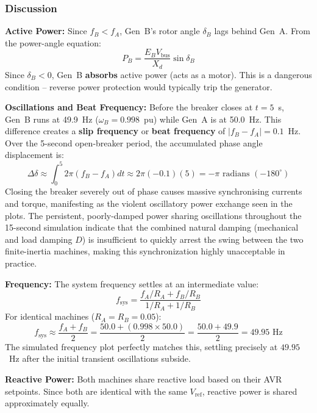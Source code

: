 \documentclass[12pt, a4paper]{article}
\begin{document}
\subsubsection{Discussion}

\textbf{Active Power:}
Since $f_B < f_A$, Gen~B's rotor angle $\delta_B$ lags behind Gen~A. From the power-angle equation:
\begin{equation}
    P_B = \frac{E_B V_{\text{bus}}}{X_d} \sin\delta_B
\end{equation}
Since $\delta_B < 0$, Gen~B \textbf{absorbs} active power (acts as a motor). This is a dangerous condition -- reverse power protection would typically trip the generator.

\textbf{Oscillations and Beat Frequency:}
Before the breaker closes at $t=5$~s, Gen~B runs at 49.9~Hz ($\omega_B = 0.998$~pu) while Gen~A is at 50.0~Hz. This difference creates a \textbf{slip frequency} or \textbf{beat frequency} of $|f_B - f_A| = 0.1$~Hz. Over the 5-second open-breaker period, the accumulated phase angle displacement is:
\begin{equation}
    \Delta\delta \approx \int_0^5 2\pi(f_B - f_A) dt \approx 2\pi(-0.1)(5) = -\pi\text{ radians } (-180^\circ)
\end{equation}
Closing the breaker severely out of phase causes massive synchronising currents and torque, manifesting as the violent oscillatory power exchange seen in the plots. The persistent, poorly-damped power sharing oscillations throughout the 15-second simulation indicate that the combined natural damping (mechanical and load damping $D$) is insufficient to quickly arrest the swing between the two finite-inertia machines, making this synchronization highly unacceptable in practice.

\textbf{Frequency:}
The system frequency settles at an intermediate value:
\begin{equation}
    f_{\text{sys}} = \frac{f_A / R_A + f_B / R_B}{1/R_A + 1/R_B}
    \label{eq:freq_sharing}
\end{equation}
For identical machines ($R_A = R_B = 0.05$): 
\begin{equation}
    f_{\text{sys}} \approx \frac{f_A + f_B}{2} = \frac{50.0 + (0.998 \times 50.0)}{2} = \frac{50.0 + 49.9}{2} = 49.95\text{ Hz}
\end{equation}
The simulated frequency plot perfectly matches this, settling precisely at $49.95$~Hz after the initial transient oscillations subside.

\textbf{Reactive Power:}
Both machines share reactive load based on their AVR setpoints. Since both are identical with the same $V_{\text{ref}}$, reactive power is shared approximately equally.
\end{document}
